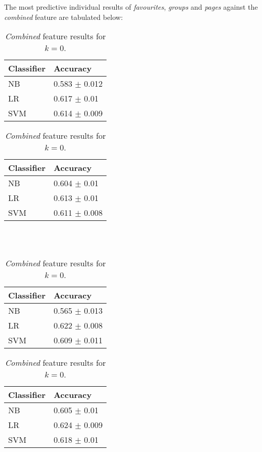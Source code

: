 The most predictive individual results of \emph{favourites}, \emph{groups} and \emph{pages} against the \emph{combined}
feature are tabulated below:

\begin{table}[h]
\begin{minipage}[b]{.50\textwidth}
\centering
  \begin{tabular}{|l|l|} %
  \hline
  		\textbf{Classifier} & \textbf{Accuracy} \\ \hline
		NB & 0.583 $\pm$ 0.012 \\ \hline
		LR & 0.617 $\pm$ 0.01 \\ \hline
		SVM & 0.614 $\pm$ 0.009 \\ \hline
  \end{tabular}
  \caption{\emph{Favourite} feature results for $k=0$.}
\end{minipage}
\begin{minipage}[b]{.50\textwidth}
\centering
  \begin{tabular}{|l|l|} %
  \hline
  		\textbf{Classifier} & \textbf{Accuracy} \\ \hline
		NB & 0.604 $\pm$ 0.01 \\ \hline
		LR & 0.613 $\pm$ 0.01 \\ \hline
		SVM & 0.611 $\pm$ 0.008 \\ \hline
  \end{tabular}
  \caption{\emph{Pages} feature results for $k=0$.}
\end{minipage}
\\
\\
\begin{minipage}[b]{.50\textwidth}
\centering
  \begin{tabular}{|l|l|} %
  \hline
  		\textbf{Classifier} & \textbf{Accuracy} \\ \hline
		NB & 0.565 $\pm$ 0.013 \\ \hline
		LR & 0.622 $\pm$ 0.008 \\ \hline
		SVM & 0.609 $\pm$ 0.011 \\ \hline
  \end{tabular}
  \caption{\emph{Groups} feature results for $k=0$.}
\end{minipage}
\begin{minipage}[b]{.50\textwidth}
\centering
  \begin{tabular}{|l|l|} %
  \hline
  		\textbf{Classifier} & \textbf{Accuracy} \\ \hline
		NB & 0.605 $\pm$ 0.01 \\ \hline
		LR & 0.624 $\pm$ 0.009 \\ \hline
		SVM & 0.618 $\pm$ 0.01 \\ \hline
  \end{tabular}
  \caption{\emph{Combined} feature results for $k=0$.}
\end{minipage}
\end{table}

